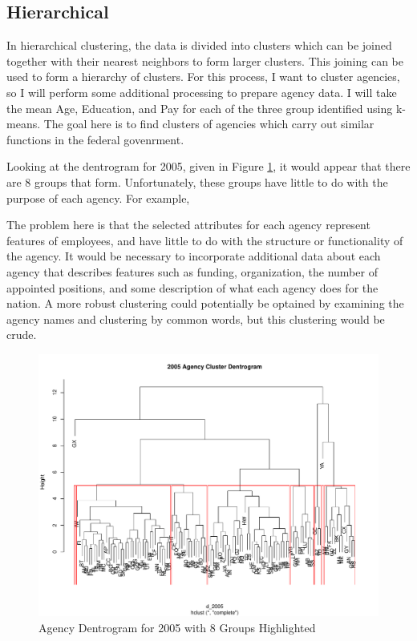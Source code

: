 \documentclass{article}
\begin{document}
    \subsection{Hierarchical}
    In hierarchical clustering, the data is divided into clusters which can be joined together with their nearest neighbors to form larger clusters. This joining can be used to form a hierarchy of clusters. For this process, I want to cluster agencies, so I will perform some additional processing to prepare agency data. I will take the mean Age, Education, and Pay for each of the three group identified using k-means. The goal here is to find clusters of agencies which carry out similar functions in the federal govenrment.
    \par
    Looking at the dentrogram for 2005, given in Figure \ref{fig:4}, it would appear that there are 8 groups that form. Unfortunately, these groups have little to do with the purpose of each agency. For example,
    \par
    The problem here is that the selected attributes for each agency represent features of employees, and have little to do with the structure or functionality of the agency. It would be necessary to incorporate additional data about each agency that describes features such as funding, organization, the number of appointed positions, and some description of what each agency does for the nation. A more robust clustering could potentially be optained by examining the agency names and clustering by common words, but this clustering would be crude.

    \begin{center}
        \begin{figure}
            \includegraphics[scale=0.4]{./images/2005-dentrogram.pdf}
            \caption{Agency Dentrogram for 2005 with 8 Groups Highlighted}
            \label{fig:4}
        \end{figure}
    \end{center}
\end{document}
